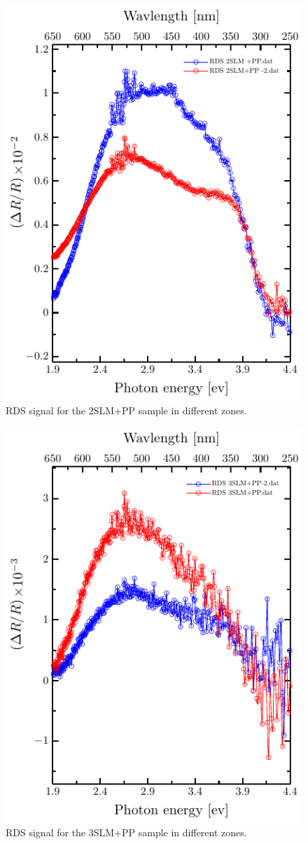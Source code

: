 \begin{figure}
	\centering
	\includegraphics[width=0.5\linewidth]{"FIGURES/Anexo-CuSn/RDS2SLM+PP"}
	\caption{RDS signal for the 2SLM+PP sample in different zones. }
	\label{fig:rds-1-slmpp-2}
\end{figure}

\begin{figure}
	\centering
	\includegraphics[width=0.5\linewidth]{"FIGURES/Anexo-CuSn/RDS3SLM+PP-2"}
	\caption{RDS signal for the 3SLM+PP sample in different zones. }
	\label{fig:rds-1-slmpp-2}
\end{figure}


